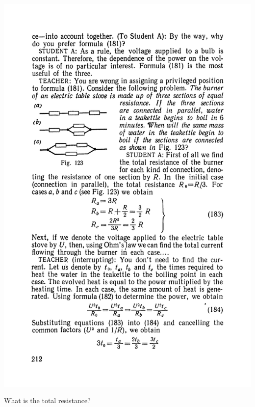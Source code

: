 \documentclass[a4paper,sfsidenotes]{tufte-book}
\begin{document}
\begin{marginfigure}%
\centering
\includegraphics[width=\linewidth]{fig-123a}
\caption{ What is the total resistance?}
\label{fig-123}
\end{marginfigure}
\end{document}
